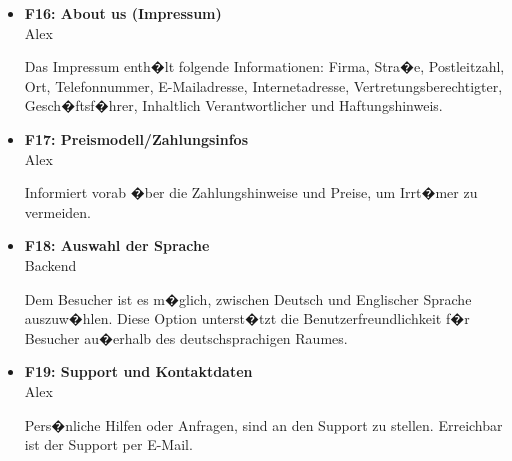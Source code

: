 \documentclass[10pt,a4paper]{scrartcl}
\begin{document}
\begin{itemize}
\item[] \textbf{F16: About us (Impressum)}\\

Alex

Das Impressum enth�lt folgende Informationen: Firma, Stra�e, Postleitzahl, Ort, Telefonnummer, E-Mailadresse, Internetadresse, Vertretungsberechtigter, \\ Gesch�ftsf�hrer, Inhaltlich Verantwortlicher und Haftungshinweis. 

\item[] \textbf{F17: Preismodell/Zahlungsinfos}\\

Alex

Informiert vorab �ber die Zahlungshinweise und Preise, um Irrt�mer zu vermeiden.


\item[] \textbf{F18: Auswahl der Sprache}\\

Backend

Dem Besucher ist es m�glich, zwischen Deutsch und Englischer Sprache auszuw�hlen. Diese Option unterst�tzt die Benutzerfreundlichkeit f�r Besucher au�erhalb des deutschsprachigen Raumes. 

\item[] \textbf{F19: Support und Kontaktdaten}\\

Alex

Pers�nliche Hilfen oder Anfragen, sind an den Support zu stellen. Erreichbar ist der Support per E-Mail. 

\end{itemize}
\end{document}
